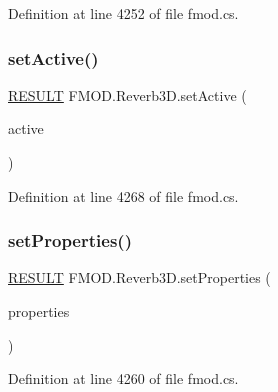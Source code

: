 Definition at line 4252 of file fmod.\+cs.

\mbox{\label{class_f_m_o_d_1_1_reverb3_d_a4d528c30020c3426e65dac1f5427e878}} 
\subsubsection{\texorpdfstring{set\+Active()}{setActive()}}
{\footnotesize\ttfamily \hyperlink{namespace_f_m_o_d_a305d1176ef3f8c8815861a60407ac33d}{R\+E\+S\+U\+LT} F\+M\+O\+D.\+Reverb3\+D.\+set\+Active (\begin{DoxyParamCaption}\item[{bool}]{active }\end{DoxyParamCaption})}



Definition at line 4268 of file fmod.\+cs.

\mbox{\label{class_f_m_o_d_1_1_reverb3_d_af16e44ba6013b50085dcf63a6a879d60}} 
\subsubsection{\texorpdfstring{set\+Properties()}{setProperties()}}
{\footnotesize\ttfamily \hyperlink{namespace_f_m_o_d_a305d1176ef3f8c8815861a60407ac33d}{R\+E\+S\+U\+LT} F\+M\+O\+D.\+Reverb3\+D.\+set\+Properties (\begin{DoxyParamCaption}\item[{ref \hyperlink{struct_f_m_o_d_1_1_r_e_v_e_r_b___p_r_o_p_e_r_t_i_e_s}{R\+E\+V\+E\+R\+B\+\_\+\+P\+R\+O\+P\+E\+R\+T\+I\+ES}}]{properties }\end{DoxyParamCaption})}



Definition at line 4260 of file fmod.\+cs.

\mbox{\label{class_f_m_o_d_1_1_reverb3_d_a3300368e83bffa3e4b753f520e335952}} 
